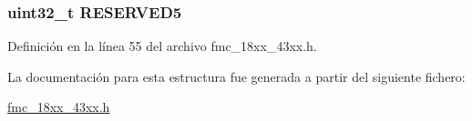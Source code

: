 \subsubsection[{\texorpdfstring{R\+E\+S\+E\+R\+V\+E\+D5}{RESERVED5}}]{ uint32\+\_\+t R\+E\+S\+E\+R\+V\+E\+D5}\hypertarget{struct_l_p_c___f_m_c___t_aa83bddd1f180bafbb96085399f847cd7}{}\label{struct_l_p_c___f_m_c___t_aa83bddd1f180bafbb96085399f847cd7}


Definición en la línea 55 del archivo fmc\+\_\+18xx\+\_\+43xx.\+h.



La documentación para esta estructura fue generada a partir del siguiente fichero\+:\begin{DoxyCompactItemize}
\item 
\hyperlink{fmc__18xx__43xx_8h}{fmc\+\_\+18xx\+\_\+43xx.\+h}\end{DoxyCompactItemize}
